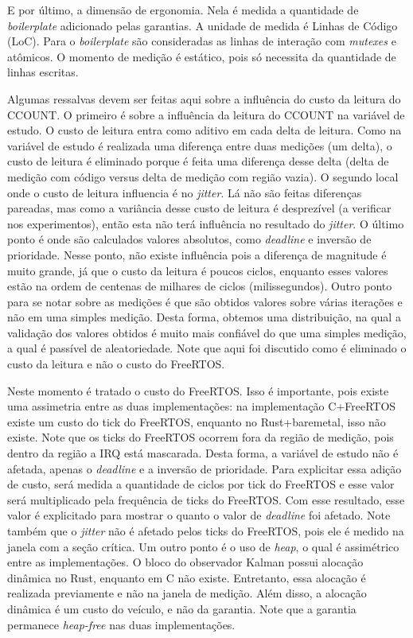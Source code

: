 E por último, a dimensão de ergonomia. Nela é medida a quantidade de \textit{boilerplate} adicionado pelas garantias. A unidade de medida é Linhas de Código (\ac{LoC}). Para o \textit{boilerplate} são consideradas as linhas de interação com \textit{mutexes} e atômicos. O momento de medição é estático, pois só necessita da quantidade de linhas escritas.

Algumas ressalvas devem ser feitas aqui sobre a influência do custo da leitura do CCOUNT. O primeiro é sobre a influência da leitura do CCOUNT na variável de estudo. O custo de leitura entra como aditivo em cada delta de leitura. Como na variável de estudo é realizada uma diferença entre duas medições (um delta), o custo de leitura é eliminado porque é feita uma diferença desse delta (delta de medição com código versus delta de medição com região vazia). O segundo local onde o custo de leitura influencia é no \textit{jitter}. Lá não são feitas diferenças pareadas, mas como a variância desse custo de leitura é desprezível (a verificar nos experimentos), então esta não terá influência no resultado do \textit{jitter}. O último ponto é onde são calculados valores absolutos, como \textit{deadline} e inversão de prioridade. Nesse ponto, não existe influência pois a diferença de magnitude é muito grande, já que o custo da leitura é poucos ciclos, enquanto esses valores estão na ordem de centenas de milhares de ciclos (milissegundos). Outro ponto para se notar sobre as medições é que são obtidos valores sobre várias iterações e não em uma simples medição. Desta forma, obtemos uma distribuição, na qual a validação dos valores obtidos é muito mais confiável do que uma simples medição, a qual é passível de aleatoriedade. Note que aqui foi discutido como é eliminado o custo da leitura e não o custo do FreeRTOS.

Neste momento é tratado o custo do FreeRTOS. Isso é importante, pois existe uma assimetria entre as duas implementações: na implementação C+FreeRTOS existe um custo do tick do FreeRTOS, enquanto no Rust+baremetal, isso não existe. Note que os ticks do FreeRTOS ocorrem fora da região de medição, pois dentro da região a \ac{IRQ} está mascarada. Desta forma, a variável de estudo não é afetada, apenas o \textit{deadline} e a inversão de prioridade. Para explicitar essa adição de custo, será medida a quantidade de ciclos por tick do FreeRTOS e esse valor será multiplicado pela frequência de ticks do FreeRTOS. Com esse resultado, esse valor é explicitado para mostrar o quanto o valor de \textit{deadline} foi afetado. Note também que o \textit{jitter} não é afetado pelos ticks do FreeRTOS, pois ele é medido na janela com a seção crítica. Um outro ponto é o uso de \textit{heap}, o qual é assimétrico entre as implementações. O bloco do observador Kalman possui alocação dinâmica no Rust, enquanto em C não existe. Entretanto, essa alocação é realizada previamente e não na janela de medição. Além disso, a alocação dinâmica é um custo do veículo, e não da garantia. Note que a garantia permanece \textit{heap-free} nas duas implementações.

